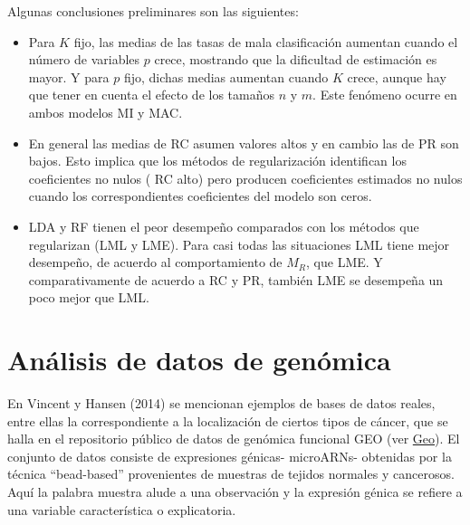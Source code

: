 \documentclass{report}
\begin{document}
 
 Algunas conclusiones preliminares son las siguientes:
 
 \begin{itemize}
 	\item  Para $K$ fijo, las medias de las tasas de mala clasificación  aumentan cuando el número de variables $p$ crece, mostrando que la dificultad de estimación es mayor. Y para $p$ fijo, dichas medias aumentan cuando $K$ crece, aunque hay que tener en cuenta el efecto de los tamaños $n$ y $m$. Este fenómeno ocurre en ambos modelos MI y MAC.
 	\item En general las medias de RC asumen valores altos y en cambio las de PR son bajos. Esto implica que los métodos de regularización identifican los coeficientes no nulos ( RC alto) pero producen coeficientes estimados no nulos cuando los correspondientes coeficientes del modelo son ceros.
 	
 	\item  LDA y RF tienen el peor desempeño comparados con los métodos que regularizan (LML y LME). Para  casi todas las situaciones LML tiene mejor desempeño, de acuerdo al comportamiento de $M_R$, que LME.   Y comparativamente de acuerdo a RC y PR, también LME se desempeña un poco mejor que LML.
 	
 	   
 	
 \end{itemize}
 
 
 
 
 
 
 
 
 
 \section{ Análisis de datos de genómica }
 
 
 En Vincent y Hansen (2014) se mencionan  ejemplos de bases de datos reales, entre ellas la correspondiente a la localización de ciertos tipos de cáncer, que se halla en el repositorio público de datos de genómica funcional GEO (ver  \href{https://healthdata.gov/dataset/Gene-Expression-Omnibus-GEO-/ypwa-g5v3/about_data}{Geo}). El conjunto de datos consiste de  expresiones génicas- microARNs- obtenidas por la técnica ``bead-based'' provenientes de  muestras de tejidos normales y cancerosos.  Aquí la palabra muestra alude a una observación y la expresión génica se refiere a una variable característica o explicatoria.  
 
\end{document}
